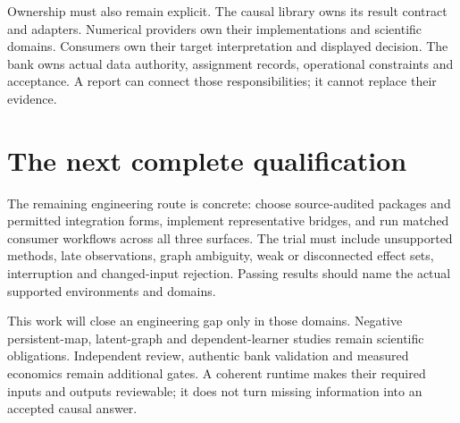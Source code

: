 Ownership must also remain explicit. The causal library owns its result
contract and adapters. Numerical providers own their implementations and
scientific domains. Consumers own their target interpretation and displayed
decision. The bank owns actual data authority, assignment records, operational
constraints and acceptance. A report can connect those responsibilities; it
cannot replace their evidence.

\section{The next complete qualification}

The remaining engineering route is concrete: choose source-audited packages
and permitted integration forms, implement representative bridges, and run
matched consumer workflows across all three surfaces. The trial must include
unsupported methods, late observations, graph ambiguity, weak or disconnected
effect sets, interruption and changed-input rejection. Passing results should
name the actual supported environments and domains.

This work will close an engineering gap only in those domains. Negative
persistent-map, latent-graph and dependent-learner studies remain scientific
obligations. Independent review, authentic bank validation and measured
economics remain additional gates. A coherent runtime makes their required
inputs and outputs reviewable; it does not turn missing information into an
accepted causal answer.
